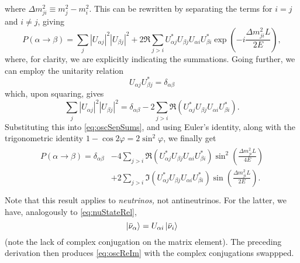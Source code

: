 \documentclass[../thesis.tex]{subfiles}
\begin{document}
where \(\Delta m^2_{ji} \equiv m^2_j - m^2_i\). This can be rewritten by
separating the terms for \(i = j\) and \(i \neq j\), giving
\begin{equation}
  \label{eq:oscSepSums}
  P(\alpha \rightarrow \beta) = \sum_{j} |U_{\alpha j}|^2 |U_{\beta j}|^2
  + 2 \Re \sum_{j>i} U^*_{\alpha j} U_{\beta j} U_{\alpha i} U^*_{\beta i}
  \exp\left( -i \frac{\Delta m^2_{ji}L}{2E} \right),
\end{equation}
where, for clarity, we are explicitly indicating the summations. Going further,
we can employ the unitarity relation
\begin{equation*}
  U_{\alpha j} U^*_{\beta j} = \delta_{\alpha \beta}
\end{equation*}
which, upon squaring, gives
\begin{equation*}
  \sum_j |U_{\alpha j}|^2 |U_{\beta j}|^2 = \delta_{\alpha \beta}
  - 2 \sum_{j > i} \Re(U^*_{\alpha j} U_{\beta j} U_{\alpha i} U^*_{\beta i}).
\end{equation*}
Substituting this into \eqref{eq:oscSepSums}, and using Euler's identity, along
with the trigonometric identity \(1 - \cos 2\varphi = 2\sin^2 \varphi\), we
finally get
\begin{align}
  \label{eq:oscReIm}
  \begin{split}
    P(\alpha \rightarrow \beta) = \delta_{\alpha \beta} &- 4\sum_{j > i}
    \Re(U^*_{\alpha j} U_{\beta j} U_{\alpha i} U^*_{\beta i})
    \sin^2 \left( \frac{\Delta m^2_{ji}L}{4E} \right) \\
    &+ 2\sum_{j > i} \Im(U^*_{\alpha j} U_{\beta j} U_{\alpha i} U^*_{\beta i})
    \sin \left( \frac{\Delta m^2_{ji}L}{2E} \right). \\
  \end{split}
\end{align}
Note that this result applies to \emph{neutrinos,} not antineutrinos. For the
latter, we have, analogously to \eqref{eq:nuStateRel},
\begin{equation*}
  \ket{\bar\nu_\alpha} = U_{\alpha i}\ket{\bar\nu_i}
\end{equation*}
(note the lack of complex conjugation on the matrix element). The preceding
derivation then produces \eqref{eq:oscReIm} with the complex conjugations
swappped.
\end{document}
